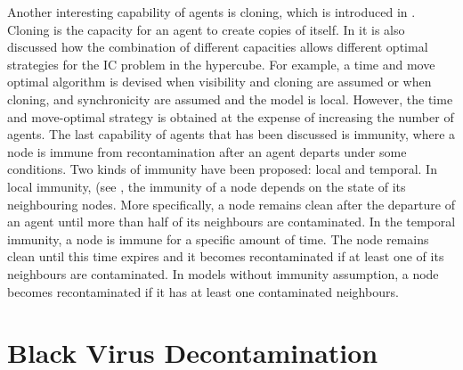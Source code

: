 Another interesting capability of agents is cloning, which is introduced in \cite{M.Huang1}. Cloning is the capacity for an agent to create copies of itself. In \cite{M.Huang1} it is also discussed how the combination of different capacities allows different optimal strategies for the IC problem in the hypercube. For example, a  time and move optimal algorithm is devised  when visibility and cloning are assumed or when cloning,  and synchronicity are assumed and the model is  local. However, the time and move-optimal strategy is obtained at the expense of increasing the number of agents.
The last capability of agents that has been discussed is immunity, where a node is immune from recontamination after an agent departs under some conditions. Two kinds of immunity have been proposed: local and temporal. In local immunity, (see
\cite{flocchini6,santoro}, the immunity of a node depends on the state of its neighbouring nodes. More specifically, a node remains clean after the departure of an agent until more than half of its neighbours are contaminated. In the temporal immunity, a node is immune for a specific amount of time. The node remains clean until this time expires and it becomes recontaminated if at least one of its neighbours are contaminated. In models without immunity assumption, a node becomes recontaminated if it has at least one contaminated neighbours.

\section{Black Virus Decontamination}
